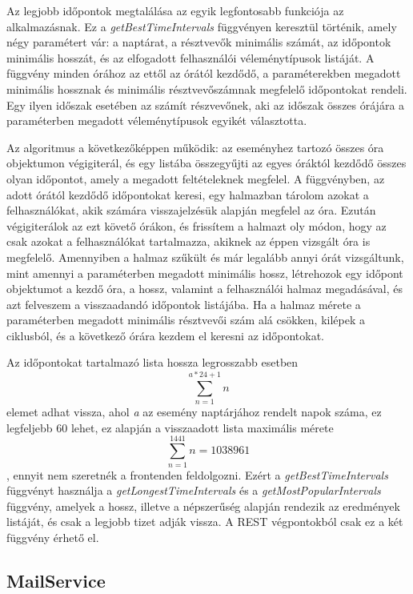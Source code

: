 \documentclass[a4paper,12pt]{report}
\theoremstyle{definition}
\theoremstyle{remark}
\begin{document}
Az legjobb időpontok megtalálása az egyik legfontosabb funkciója az alkalmazásnak. Ez a \textit{getBestTimeIntervals} függvényen keresztül történik, amely négy paramétert vár: a naptárat, a résztvevők minimális számát, az időpontok minimális hosszát, és az elfogadott felhasználói véleménytípusok listáját. A függvény minden órához az ettől az órától kezdődő, a paraméterekben megadott minimális hossznak és minimális résztvevőszámnak megfelelő időpontokat rendeli. Egy ilyen időszak esetében az számít részvevőnek, aki az időszak összes órájára a paraméterben megadott véleménytípusok egyikét választotta.

Az algoritmus a következőképpen működik: az eseményhez tartozó összes óra objektumon végigiterál, és egy listába összegyűjti az egyes óráktól kezdődő összes olyan időpontot, amely a megadott feltételeknek megfelel. A függvényben, az adott órától kezdődő időpontokat keresi, egy halmazban tárolom azokat a felhasználókat, akik számára visszajelzésük alapján megfelel az óra. Ezután végigiterálok az ezt követő órákon, és frissítem a halmazt oly módon, hogy az csak azokat a felhasználókat tartalmazza, akiknek az éppen vizsgált óra is megfelelő. Amennyiben a halmaz szűkült és már legalább annyi órát vizsgáltunk, mint amennyi a paraméterben megadott minimális hossz, létrehozok egy időpont objektumot a kezdő óra, a hossz, valamint a felhasználói halmaz megadásával, és azt felveszem a visszaadandó időpontok listájába. Ha a halmaz mérete a paraméterben megadott minimális résztvevői szám alá csökken, kilépek a ciklusból, és a következő órára kezdem el keresni az időpontokat.

Az időpontokat tartalmazó lista hossza legrosszabb esetben
\begin{equation} \label{eq:eq1}
\sum_{n=1}^{a*24+1} {n}
\end{equation}
elemet adhat vissza, ahol \textit{a} az esemény naptárjához rendelt napok száma, ez legfeljebb 60 lehet, ez alapján a visszaadott lista maximális mérete
\begin{equation} \label{eq:eq2}
 \sum_{n=1}^{1441} {n} = 1 038 961
\end{equation}
, ennyit nem szeretnék a frontenden feldolgozni. Ezért a \textit{getBestTimeIntervals} függvényt használja a \textit{getLongestTimeIntervals} és a \textit{getMostPopularIntervals} függvény, amelyek a hossz, illetve a népszerűség alapján rendezik az eredmények listáját, és csak a legjobb tizet adják vissza. A REST végpontokból csak ez a két függvény érhető el.

\subsection{MailService}
\end{document}
